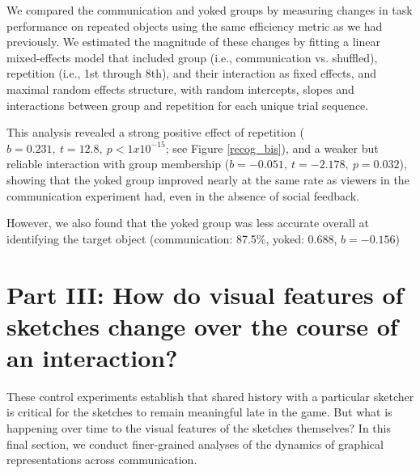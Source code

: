 \documentclass[10pt,letterpaper]{article}
\begin{document}
We compared the communication and yoked groups by measuring changes in task performance on repeated objects using the same efficiency metric as we had previously. 
We estimated the magnitude of these changes by fitting a linear mixed-effects model that included group (i.e., communication vs. shuffled), repetition (i.e., 1st through 8th), and their interaction as fixed effects, and maximal random effects structure, with random intercepts, slopes and interactions between group and repetition for each unique trial sequence. 

This analysis revealed a strong positive effect of repetition ($b = 0.231, ~t = 12.8,~p < 1x10^{-15}$; see Figure \ref{recog_bis}), and a weaker but reliable interaction with group membership ($b = -0.051, ~t = -2.178, ~p = 0.032$), showing that the yoked group improved nearly at the same rate as viewers in the communication experiment had, even in the absence of social feedback. 

However, we also found that the yoked group was less accurate overall at identifying the target object (communication: 87.5\%, yoked: 0.688, $b = -0.156$)






\section{Part III: How do visual features of sketches change over the course of an interaction?}

These control experiments establish that shared history with a particular sketcher is critical for the sketches to remain meaningful late in the game. 
But what is happening over time to the visual features of the sketches themselves? 
In this final section, we conduct finer-grained analyses of the dynamics of graphical representations across communication.
\end{document}
